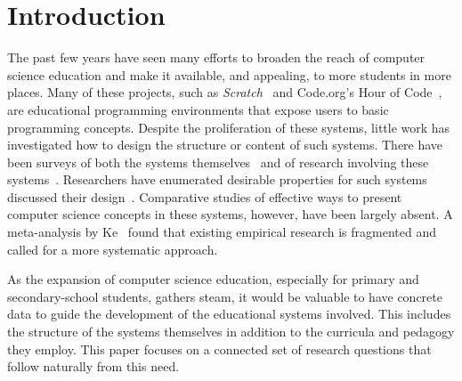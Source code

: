 \documentclass{sig-alternate}
\begin{document}
\section{Introduction}
The past few years have seen many efforts to broaden the reach of computer science education and make it available, and appealing, to more students in more places. 
Many of these projects, such as \emph{Scratch}~\cite{scratch} and Code.org's Hour of Code~\cite{codedotorg}, are educational programming environments that expose users to basic programming concepts. 
Despite the proliferation of these systems, little work has investigated how to design the structure or content of such systems. There have been surveys of both the systems themselves~\cite{guzdial2004programming, kelleher2005lowering} and of research involving these systems~\cite{salleh2013analysis, backlund2013educational}. Researchers have enumerated desirable properties for such systems~\cite{repenning2010scalable} discussed their design~\cite{powers2006tools}.
Comparative studies of effective ways to present computer science concepts in these systems, however, have been largely absent. A meta-analysis by Ke~\cite{ke2009qualitative} found that existing empirical research is fragmented and called for a more systematic approach.

As the expansion of computer science education, especially for primary and secondary-school students, gathers steam, it would be valuable to have concrete data to guide the development of the educational systems involved. 
This includes the structure of the systems themselves in addition to the curricula and pedagogy they employ. 
This paper focuses on a connected set of research questions that follow naturally from this need.

\end{document}
